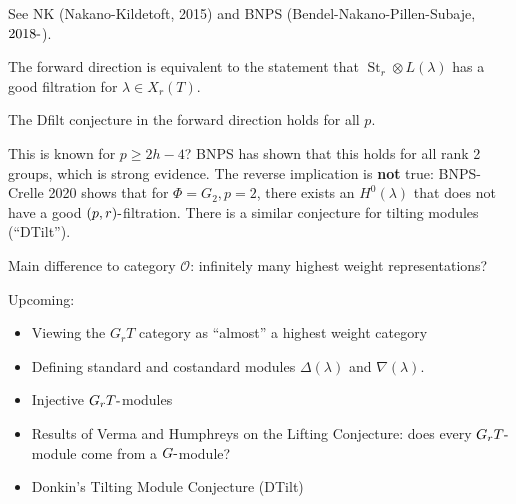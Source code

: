 \begin{remark}

See NK (Nakano-Kildetoft, 2015) and BNPS (Bendel-Nakano-Pillen-Subaje,
\(2018{\hbox{-}}\)).

\end{remark}

\begin{remark}

The forward direction is equivalent to the statement that
\(\operatorname{St}_r \otimes L(\lambda)\) has a good filtration for
\(\lambda \in X_r(T)\).

\end{remark}

\begin{proposition}[Conjecture]

The Dfilt conjecture in the forward direction holds for all \(p\).

\end{proposition}

\begin{remark}

This is known for \(p\geq 2h-4\)? BNPS has shown that this holds for all
rank 2 groups, which is strong evidence. The reverse implication is
\textbf{not} true: BNPS-Crelle 2020 shows that for \(\Phi = G_2, p=2\),
there exists an \(H^0(\lambda)\) that does not have a good
\((p, r){\hbox{-}}\)filtration. There is a similar conjecture for
tilting modules (``DTilt'').

\end{remark}

Main difference to category \({\mathcal{O}}\): infinitely many highest
weight representations?

Upcoming:

\begin{itemize}
\tightlist
\item
  Viewing the \(G_r T\) category as ``almost'' a highest weight category
\item
  Defining standard and costandard modules \(\Delta(\lambda)\) and
  \(\nabla(\lambda)\).
\item
  Injective \(G_r T{\hbox{-}}\)modules
\item
  Results of Verma and Humphreys on the Lifting Conjecture: does every
  \(G_r T{\hbox{-}}\)module come from a \(G{\hbox{-}}\)module?
\item
  Donkin's Tilting Module Conjecture (DTilt)
\end{itemize}

